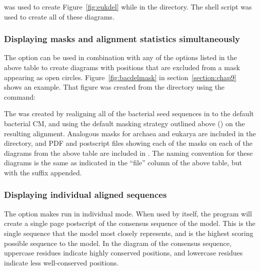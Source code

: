
was used to create Figure~\ref{fig:eukdel} while in the 
 directory.
The shell script
was used to create all of these diagrams.

\subsubsection{Displaying masks and alignment statistics simultaneously}

The  option can be used in combination with any of the
options listed in the above table to create diagrams 
with positions that are excluded from a mask appearing as open
circles. Figure~\ref{fig:bacdelmask} in section~\ref{section:chap9}
shows an example. That figure was created from the
 directory using the command:


The  was created by realigning all
of the bacterial seed sequences in
 to the default bacterial
CM, and using the default masking strategy outlined above 
()
on the resulting alignment. Analogous masks for archaea and eukarya
are included in the  directory, and PDF and
postscript files showing each of the masks on each of the diagrams
from the above table are included in 
. The naming convention for
these diagrams is the same as indicated in the ``file'' column of the
above table, but with the suffix  appended.

\subsubsection{Displaying individual aligned sequences}

The  option makes  run in individual
mode. When used by itself, the program will create a single page
postscript of the consensus sequence of the model. This is the
single sequence that the model most closely represents, and is the
highest scoring possible sequence to the model. In the diagram of the
consensus sequence, uppercase residues indicate highly conserved positions,
and lowercase residues indicate less well-conserved positions.

